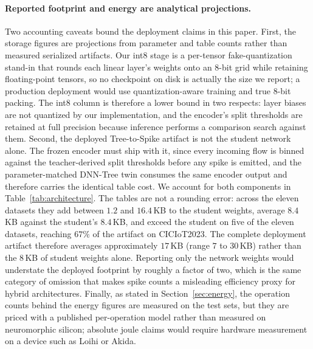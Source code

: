 \paragraph{Reported footprint and energy are analytical projections.}
Two accounting caveats bound the deployment claims in this paper. First, the
storage figures are projections from parameter and table counts rather than
measured serialized artifacts. Our int8 stage is a per-tensor fake-quantization
stand-in that rounds each linear layer's weights onto an 8-bit grid while
retaining floating-point tensors, so no checkpoint on disk is actually the size
we report; a production deployment would use quantization-aware training and
true 8-bit packing. The int8 column is therefore a lower bound in two respects:
layer biases are not quantized by our implementation, and the encoder's split
thresholds are retained at full precision because inference performs a
comparison search against them. Second, the deployed Tree-to-Spike artifact is
not the student network alone. The frozen encoder must ship with it, since
every incoming flow is binned against the teacher-derived split thresholds
before any spike is emitted, and the parameter-matched DNN-Tree twin consumes
the same encoder output and therefore carries the identical table cost. We
account for both components in Table~\ref{tab:architecture}. The tables are
not a rounding error: across the eleven datasets they add between $1.2$ and
$16.4$\,KB to the student weights, average $8.4$\,KB against the student's
$8.4$\,KB, and exceed the student on five of the eleven datasets, reaching
$67\%$ of the artifact on CICIoT2023. The complete deployment artifact
therefore averages approximately $17$\,KB (range $7$ to $30$\,KB) rather than
the $8$\,KB of student weights alone. Reporting only the network weights would
understate the deployed footprint by roughly a factor of two, which is the
same category of omission that makes spike counts a misleading efficiency
proxy for hybrid architectures.
Finally, as stated in Section~\ref{sec:energy}, the operation counts behind the
energy figures are measured on the test sets, but they are priced with a
published per-operation model rather than measured on neuromorphic silicon;
absolute joule claims would require hardware measurement on a device such as
Loihi or Akida.
